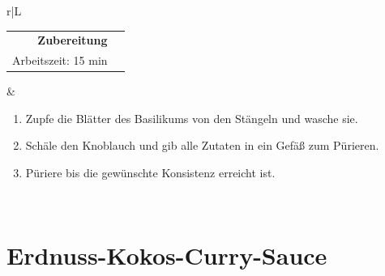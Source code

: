 \documentclass[a4paper, 12pt]{scrbook} 								%
\numberwithin{equation}{section} 									%
\begin{document}
\begin{tabularx}{\textwidth}{r|L}
		\begin{tabular}[t]{rr}
			\textbf{Zubereitung}	\\
			Arbeitszeit: 15 min	\\
		\end{tabular}			&	\begin{enumerate}[]
										\item Zupfe die Blätter des Basilikums von den Stängeln und wasche sie.
										\item Schäle den Knoblauch und gib alle Zutaten in ein Gefäß zum Pürieren.
										\item Püriere bis die gewünschte Konsistenz erreicht ist.
									\end{enumerate}	\\
	\end{tabularx}
	\newpage


	\section{Erdnuss-Kokos-Curry-Sauce}	\label{erdnuss_sauce}
\end{document}
